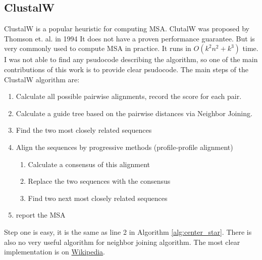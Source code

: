 \documentclass[11pt]{article}
\begin{document}
\subsection{ClustalW}
ClustalW is a popular heuristic for computing MSA. 
ClutalW was proposed by Thomson et. al. in 1994 \cite{thompson1994clustal}
It does not have a proven performance guarantee. But is very commonly used to compute MSA in practice.
It runs in $O(k^2 n^2 + k^3)$ time. 
I was not able to find any psudocode describing the algorithm,
so one of the main contributions of this work is to provide clear psudocode.
The main steps of the ClustalW algorithm are:

\begin{enumerate}
    \item Calculate all possible pairwise alignments, record the score for each pair.
    \item Calculate a guide tree based on the pairwise distances via Neighbor Joining.
    \item Find the two most closely related sequences
    \item Align the sequences by progressive methods (profile-profile alignment)
    
    \begin{enumerate}
        \item Calculate a consensus of this alignment
        \item Replace the two sequences with the consensus
        \item Find two next most closely related sequences
    \end{enumerate}

    \item report the MSA
\end{enumerate}

Step one is easy, it is the same as line 2 in Algorithm \ref{alg:center_star}. 
There is also no very useful algorithm for neighbor joining algorithm.
The most clear implementation is on \href{https://en.wikipedia.org/wiki/Neighbor_joining}{Wikipedia}.
\end{document}
